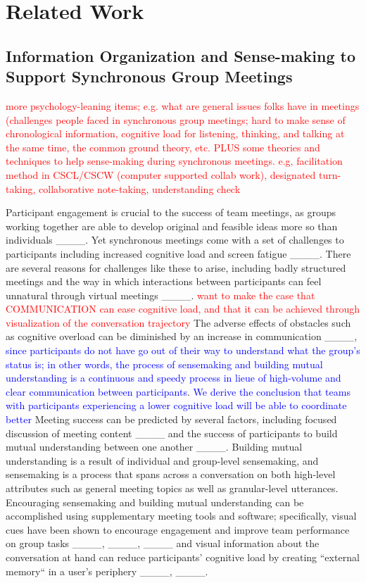 \section{Related Work}
\subsection{Information Organization and Sense-making to Support Synchronous Group Meetings}

\textcolor{red}{more psychology-leaning items; e.g. what are general issues folks have in meetings (challenges people faced in synchronous group meetings; hard to make sense of chronological information, cognitive load for listening, thinking, and talking at the same time, the common ground theory, etc. PLUS some theories and techniques to help sense-making during synchronous meetings. e.g, facilitation method in CSCL/CSCW (computer supported collab work), designated turn-taking, collaborative note-taking, understanding check}

Participant engagement is crucial to the success of team meetings, as groups working together are able to develop original and feasible ideas more so than individuals ____. Yet synchronous meetings come with a set of challenges to participants including increased cognitive load and screen fatigue ____. There are several reasons for challenges like these to arise, including badly structured meetings and the way in which interactions between participants can feel unnatural through virtual meetings ____. \textcolor{red}{want to make the case that COMMUNICATION can ease cognitive load, and that it can be achieved through visualization of the conversation trajectory}
The adverse effects of obstacles such as cognitive overload can be diminished by an increase in communication ____, \textcolor{blue}{since participants do not have go out of their way to understand what the group's status is; in other words, the process of sensemaking and building mutual understanding is a continuous and speedy process in lieue of high-volume and clear communication between participants}. 
\textcolor{blue}{We derive the conclusion that teams with participants experiencing a lower cognitive load will be able to coordinate better}
Meeting success can be predicted by several factors, including focused discussion of meeting content ____ and the success of participants to build mutual understanding between one another ____. Building mutual understanding is a result of individual and group-level sensemaking, and sensemaking is a process that spans across a conversation on both high-level attributes such as general meeting topics as well as granular-level utterances. Encouraging sensemaking and building mutual understanding can be accomplished using supplementary meeting tools and software; specifically, visual cues have been shown to encourage engagement and improve team performance on group tasks ____, ____, ____ and visual information about the conversation at hand can reduce participants' cognitive load by creating ``external memory`` in a user's periphery ____, ____.

